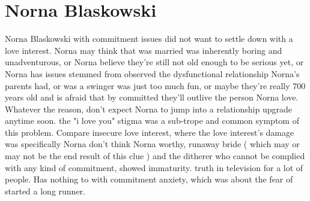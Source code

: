 \documentclass[12pt]{book}
\begin{document}
\chapter{Norna Blaskowski}

Norna Blaskowski with commitment issues did not want to settle down with a love interest. Norna may think that was married was inherently boring and unadventurous, or Norna believe they're still not old enough to be serious yet, or Norna has issues stemmed from observed the dysfunctional relationship Norna's parents had, or was a swinger was just too much fun, or maybe they're really 700 years old and is afraid that by committed they'll outlive the person Norna love. Whatever the reason, don't expect Norna to jump into a relationship upgrade anytime soon. the "i love you" stigma was a sub-trope and common symptom of this problem. Compare insecure love interest, where the love interest's damage was specifically Norna don't think Norna worthy, runaway bride ( which may or may not be the end result of this clue ) and the ditherer who cannot be complied with any kind of commitment, showed immaturity. truth in television for a lot of people. Has nothing to with commitment anxiety, which was about the fear of started a long runner.
\end{document}
